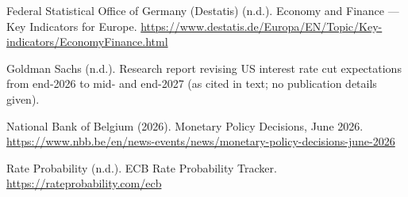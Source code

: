 \documentclass[11pt,a4paper]{article}
\begin{document}
\begin{fshfreferences}
\item Federal Statistical Office of Germany (Destatis) (n.d.). Economy and Finance --- Key Indicators for Europe. \url{https://www.destatis.de/Europa/EN/Topic/Key-indicators/EconomyFinance.html}
\item Goldman Sachs (n.d.). Research report revising US interest rate cut expectations from end-2026 to mid- and end-2027 (as cited in text; no publication details given).
\item National Bank of Belgium (2026). Monetary Policy Decisions, June 2026. \url{https://www.nbb.be/en/news-events/news/monetary-policy-decisions-june-2026}
\item Rate Probability (n.d.). ECB Rate Probability Tracker. \url{https://rateprobability.com/ecb}
\end{fshfreferences}

\end{document}
